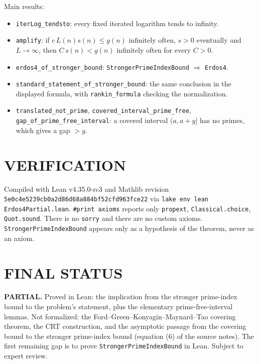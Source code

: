 Main results:
\begin{itemize}
\item \texttt{iterLog\_tendsto}: every fixed iterated logarithm tends to infinity.
\item \texttt{amplify}: if $c\,L(n)s(n)\le g(n)$ infinitely often, $s>0$ eventually and $L\to\infty$, then $C\,s(n)<g(n)$ infinitely often for every $C>0$.
\item \texttt{erdos4\_of\_stronger\_bound}: \texttt{StrongerPrimeIndexBound} $\Rightarrow$ \texttt{Erdos4}.
\item \texttt{standard\_statement\_of\_stronger\_bound}: the same conclusion in the displayed formula, with \texttt{rankin\_formula} checking the normalization.
\item \texttt{translated\_not\_prime}, \texttt{covered\_interval\_prime\_free}, \texttt{gap\_of\_prime\_free\_interval}: a covered interval $(a,a+y]$ has no primes, which gives a gap $>y$.
\end{itemize}

\section{VERIFICATION}
Compiled with Lean v4.35.0-rc3 and Mathlib revision \texttt{5e0c4e5239cb0a2d86d68a884bf52cfd963fce22} via \texttt{lake env lean Erdos4Partial.lean}. \texttt{\#print axioms} reports only \texttt{propext}, \texttt{Classical.choice}, \texttt{Quot.sound}. There is no \texttt{sorry} and there are no custom axioms. \texttt{StrongerPrimeIndexBound} appears only as a hypothesis of the theorem, never as an axiom.

\section{FINAL STATUS}
\textbf{PARTIAL.} Proved in Lean: the implication from the stronger prime-index bound to the problem's statement, plus the elementary prime-free-interval lemmas. Not formalized: the Ford--Green--Konyagin--Maynard--Tao covering theorem, the CRT construction, and the asymptotic passage from the covering bound to the stronger prime-index bound (equation (6) of the source notes). The first remaining gap is to prove \texttt{StrongerPrimeIndexBound} in Lean. Subject to expert review.
